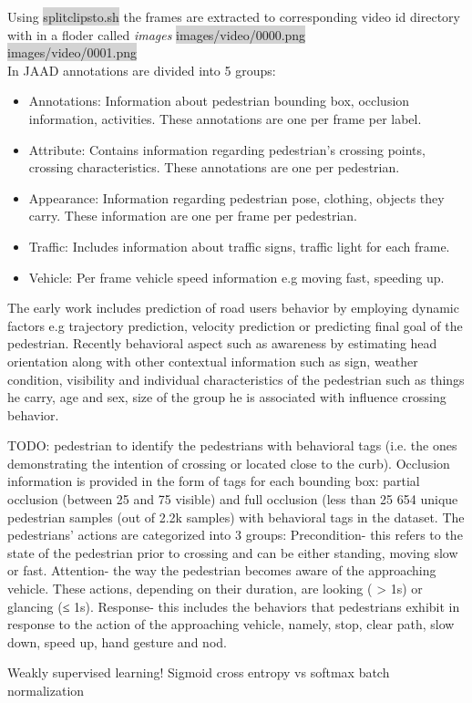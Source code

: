 Using \colorbox{lightgray}{split\textunderscore clips\textunderscore to\textunderscore .sh} the frames are extracted to corresponding video id directory with in a floder called \textit{images}
\colorbox{lightgray} {images/video/0000.png} \\
\colorbox{lightgray} {images/video/0001.png} \\

In JAAD annotations are divided into 5 groups:
\begin{itemize}
	\item Annotations: Information about pedestrian bounding box, occlusion information, activities. These annotations are one per frame per label.
	\item Attribute: Contains information regarding pedestrian’s crossing points, crossing characteristics. These annotations are one per pedestrian.
	\item Appearance: Information regarding pedestrian pose, clothing, objects they carry. These information are one per frame per pedestrian.
	\item Traffic: Includes information about traffic signs, traffic light for each frame.
	\item Vehicle: Per frame vehicle speed information e.g moving fast, speeding up.
\end{itemize}


The early work includes prediction of road users behavior by employing dynamic factors e.g trajectory prediction, velocity prediction or predicting final goal of the pedestrian. Recently behavioral aspect such as awareness by estimating head orientation along with other contextual information such as sign, weather condition, visibility and individual characteristics of the pedestrian such as things he carry, age and sex, size of the group he is associated with influence crossing behavior.

TODO:  pedestrian to identify the pedestrians with behavioral tags (i.e. the ones demonstrating the intention of crossing or located close to the curb). 
Occlusion information is provided in the form of tags for
each bounding box: partial occlusion (between 25 and 75%
visible) and full occlusion (less than 25%
 654 unique pedestrian samples (out of 2.2k samples) with behavioral tags in the
dataset. 
The
pedestrians’ actions are categorized into 3 groups: Precondition- this refers to the state of the pedestrian prior to crossing and can be either standing, moving slow or fast. Attention- the way the pedestrian becomes aware of the approaching vehicle. These actions, depending on their duration, are looking ( > 1s) or glancing (≤ 1s). Response- this
includes the behaviors that pedestrians exhibit in response
to the action of the approaching vehicle, namely, stop, clear path, slow down, speed up, hand gesture and nod.

Weakly supervised learning!
Sigmoid cross entropy vs  softmax
batch normalization



